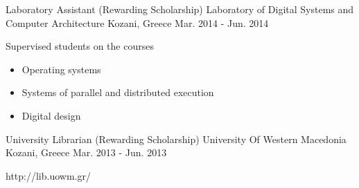 \begin{cventries}

\cventry
{Laboratory Assistant (Rewarding Scholarship)} %
{Laboratory of Digital Systems and Computer Architecture} %
{Kozani, Greece} %
{Mar. 2014 - Jun. 2014} %
{ %
\begin{cvitems}
\item {Supervised students on the courses}
\begin{itemize}
\item {Operating systems}
\item {Systems of parallel and distributed execution}
\item {Digital design}
\end{itemize}
\end{cvitems}
}


\cventry
{University Librarian (Rewarding Scholarship)} %
{University Of Western Macedonia} %
{Kozani, Greece} %
{Mar. 2013 - Jun. 2013} %
{ %
\begin{cvitems}
\item {http://lib.uowm.gr/}
\end{cvitems}
}


\end{cventries}
